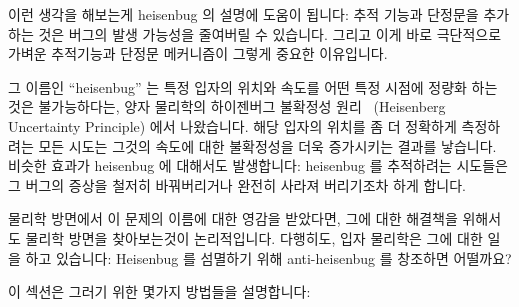 이런 생각을 해보는게 heisenbug 의 설명에 도움이 됩니다:
추적 기능과 단정문을 추가하는 것은 버그의 발생 가능성을 줄여버릴 수 있습니다.
그리고 이게 바로 극단적으로 가벼운 추적기능과 단정문 메커니즘이 그렇게 중요한
이유입니다.

그 이름인 ``heisenbug'' 는 특정 입자의 위치와 속도를 어떤 특정 시점에 정량화
하는 것은 불가능하다는, 양자 물리학의 하이젠버그 불확정성
원리~\cite{WeinerHeisenberg1927Uncertain} (Heisenberg Uncertainty Principle)
에서 나왔습니다.
해당 입자의 위치를 좀 더 정확하게 측정하려는 모든 시도는 그것의 속도에 대한
불확정성을 더욱 증가시키는 결과를 낳습니다.
비슷한 효과가 heisenbug 에 대해서도 발생합니다: heisenbug 를 추적하려는
시도들은 그 버그의 증상을 철저히 바꿔버리거나 완전히 사라져 버리기조차 하게
합니다.

물리학 방면에서 이 문제의 이름에 대한 영감을 받았다면, 그에 대한 해결책을
위해서도 물리학 방면을 찾아보는것이 논리적입니다.
다행히도, 입자 물리학은 그에 대한 일을 하고 있습니다:
Heisenbug 를 섬멸하기 위해 anti-heisenbug 를 창조하면 어떨까요?

이 섹션은 그러기 위한 몇가지 방법들을 설명합니다:

